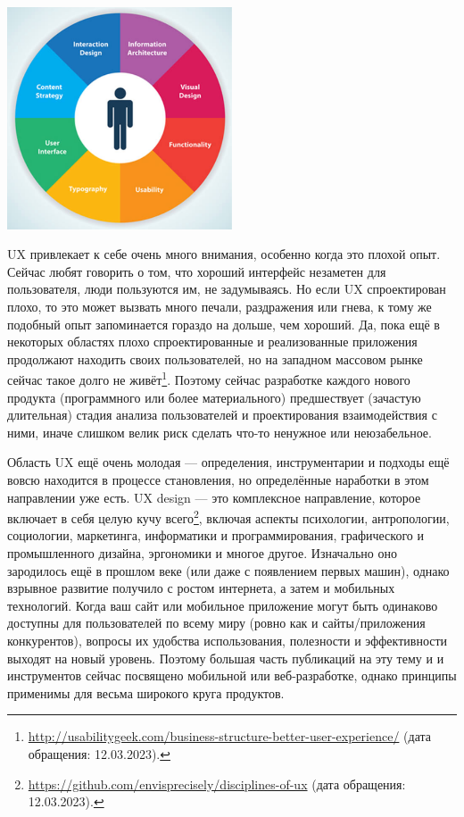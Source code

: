 \documentclass{../../text-style}
\begin{document}
\begin{center}
    \includegraphics[width=0.5\textwidth]{uxComponents.png}
\end{center}

UX привлекает к себе очень много внимания, особенно когда это плохой опыт. Сейчас любят говорить о том, что хороший интерфейс незаметен для пользователя, люди пользуются им, не задумываясь. Но если UX спроектирован плохо, то это может вызвать много печали, раздражения или гнева, к тому же подобный опыт запоминается гораздо на дольше, чем хороший. Да, пока ещё в некоторых областях плохо спроектированные и реализованные приложения продолжают находить своих пользователей, но на западном массовом рынке сейчас такое долго не живёт\footnote{\url{http://usabilitygeek.com/business-structure-better-user-experience/} (дата обращения: 12.03.2023).}. Поэтому сейчас разработке каждого нового продукта (программного или более материального) предшествует (зачастую длительная) стадия анализа пользователей и проектирования взаимодействия с ними, иначе слишком велик риск сделать что-то ненужное или неюзабельное.

Область UX ещё очень молодая --- определения, инструментарии и подходы ещё вовсю находится в процессе становления, но определённые наработки в этом направлении уже есть. UX design --- это комплексное направление, которое включает в себя целую кучу всего\footnote{\url{https://github.com/envisprecisely/disciplines-of-ux} (дата обращения: 12.03.2023).}, включая аспекты психологии, антропологии, социологии, маркетинга, информатики и программирования, графического и промышленного дизайна, эргономики и многое другое. Изначально оно зародилось ещё в прошлом веке (или даже с появлением первых машин), однако взрывное развитие получило с ростом интернета, а затем и мобильных технологий. Когда ваш сайт или мобильное приложение могут быть одинаково доступны для пользователей по всему миру (ровно как и сайты/приложения конкурентов), вопросы их удобства использования, полезности и эффективности выходят на новый уровень. Поэтому большая часть публикаций на эту тему и и инструментов сейчас посвящено мобильной или веб-разработке, однако принципы применимы для весьма широкого круга продуктов.
\end{document}

